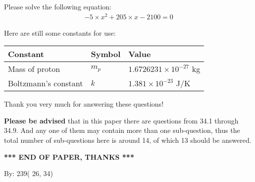 \documentclass[12pt]{article}
\begin{document}
  
 
 

 
Please solve the following equation:
\begin{eqnarray*}
-5 \times x^2  %
+  %
205
                 \times x    %
-2100 =0
\end{eqnarray*}
 

 

 
\vspace{0.3in}
   
   
 \vspace{0.2in}
Here are still some constants for use:
 
 
\noindent\begin{tabular}{|l|l|l|}
\hline
Constant & Symbol & Value \\
\hline
 
Mass of proton &
$m_p$ &
 $ 1.6726231 \times 10^{-27} $
kg \\
\hline
 
Boltzmann's constant &
$k$ &
 $ 1.381 \times 10^{-23} $
J/K \\
\hline
 
\end{tabular}
 
Thank you very much for answering these questions!
 
{\textbf{\large{Please be advised}}} that in this paper there are questions from
34.1 through
34.9.
And any one of them may contain more than one sub-question, thus the total number
of sub-questions here is around 14, of which
13 should be answered.
 
   
   
   
   
\vspace{1.0in} 
{\textbf{\large{ *** END OF PAPER, THANKS *** }}} 
   
   
\hspace{1.0in} By: 
         239(         26,          34)
   
   
 
 
\end{document}
